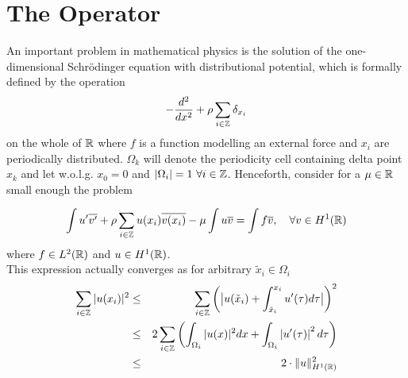 \chapter{The Operator}


An important problem in mathematical physics is the solution of the one-dimensional Schrödinger equation with distributional potential, which is formally defined by the operation
\begin{equation}
	- \frac{d^{2}}{dx^{2}} + \rho \sum_{i \in \mathbb{Z}} \delta_{x_{i}} \label{the-operator}
\end{equation}
on the whole of $\mathbb{R}$ where $f$ is a function modelling an external force and $x_{i}$ are periodically distributed. $\Omega_{k}$ will denote the periodicity cell containing delta point $x_{k}$ and let w.o.l.g. $x_{0} = 0$ and $|\Omega_{i}| = 1 ~\forall i \in \mathbb{Z}$.  Henceforth, consider	for a $\mu \in \mathbb{R}$ small enough the problem 
	
\begin{equation}
	\int u' \overline{v'} + \rho \sum_{i \in \mathbb{Z}} u(x_{i}) \overline{v(x_{i})} - \mu \int u \overline{v} = \int f \overline{v}, \quad \forall v \in H^{1}(\mathbb{R}) \label{weak-formulation}
\end{equation}	
where $f \in L^{2}(\mathbb{R})$ and $u \in H^{1}(\mathbb{R})$. \\
	
This expression actually converges as for arbitrary $\tilde{x}_{i} \in \Omega_{i}$
\begin{eqnarray}
	\sum_{i \in \mathbb{Z}} |u(x_{i})|^{2} & \leq & \sum_{i \in \mathbb{Z}} \left( \big| u(\tilde{x}_{i}) + \int_{\tilde{x}_{i}}^{x_{i}} u'( \tau ) d\tau \big| \right)^{2} \notag \\
		 & \leq & 2 \sum_{i \in \mathbb{Z}} \left( \int_{\Omega_{i}} |u( x )|^{2} dx +  \int_{\Omega_{i}} \left| u'(\tau) \right|^{2} d\tau \right) \notag \\
		 & \leq & 2 \cdot \| u \|^{2}_{H^{1}(\mathbb{R})} \label{eq:potentialestim}
\end{eqnarray}

